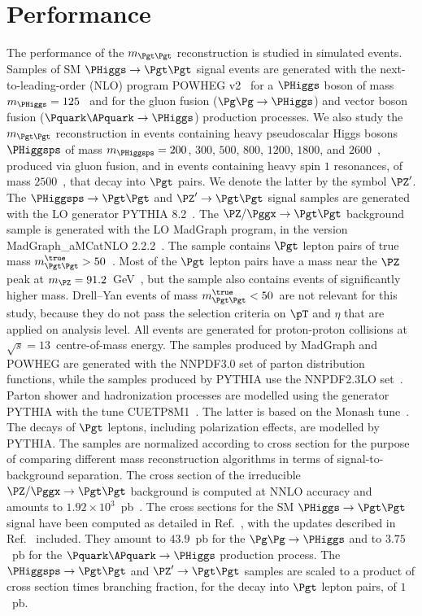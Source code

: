 \section{Performance}
\label{sec:performance}

The performance of the $m_{\Pgt\Pgt}$ reconstruction is studied in simulated events.
Samples of SM $\PHiggs \to \Pgt\Pgt$ signal events
are generated with the next-to-leading-order (NLO) program POWHEG v2~\cite{POWHEG1,POWHEG2,POWHEG3}
for a $\PHiggs$ boson of mass $m_{\PHiggs} = 125$~\GeV 
and for the gluon fusion ($\Pg\Pg \to \PHiggs$) and vector boson fusion ($\Pquark\APquark \to \PHiggs$) production processes.
We also study the $m_{\Pgt\Pgt}$ reconstruction in events containing
heavy pseudoscalar Higgs bosons $\PHiggsps$ of mass $m_{\PHiggsps} = 200$, $300$, $500$, $800$, $1200$, $1800$, and $2600$~\GeV,
produced via gluon fusion, and in events containing heavy spin $1$
resonances, of mass $2500$~\GeV, that decay into $\Pgt$ pairs.
We denote the latter by the symbol $\PZ'$. 
The $\PHiggsps \to \Pgt\Pgt$ and $\PZ' \to \Pgt\Pgt$ signal samples are generated with the LO generator PYTHIA 8.2~\cite{pythia8}.
The $\PZ/\Pggx \to \Pgt\Pgt$ background sample is generated with the LO MadGraph program, in the version MadGraph\_aMCatNLO 2.2.2~\cite{MadGraph_aMCatNLO}.
The sample contains $\Pgt$ lepton pairs of true mass $m_{\Pgt\Pgt}^{\true} > 50$~\GeV.
Most of the $\Pgt$ lepton pairs have a mass near the $\PZ$ peak at $m_{\PZ} = 91.2$~GeV~\cite{PDG}, 
but the sample also contains events of significantly higher mass.
Drell--Yan events of mass $m_{\Pgt\Pgt}^{\true} < 50$~\GeV are not relevant for this study, 
because they do not pass the selection criteria on $\pT$ and $\eta$ that are applied on analysis level.
All events are generated for proton-proton collisions at $\sqrt{s} = 13$~\TeV centre-of-mass energy.
The samples produced by MadGraph and POWHEG are generated with the NNPDF3.0 set of parton distribution functions,
while the samples produced by PYTHIA use the NNPDF2.3LO set~\cite{NNPDF1,NNPDF2,NNPDF3}.
Parton shower and hadronization processes are modelled using the generator PYTHIA with the tune CUETP8M1~\cite{PYTHIA_CUETP8M1tune_CMS}.
The latter is based on the Monash tune~\cite{PYTHIA_MonashTune}.
The decays of $\Pgt$ leptons, including polarization effects, are modelled by PYTHIA.
The samples are normalized according to cross section for the purpose of comparing different mass reconstruction algorithms in terms of signal-to-background separation.
The cross section of the irreducible $\PZ/\Pggx \to \Pgt\Pgt$ background is computed at NNLO accuracy and amounts to $1.92 \times 10^{3}$~pb~\cite{FEWZ}.
The cross sections for the SM $\PHiggs \to \Pgt\Pgt$ signal have been computed as detailed in Ref.~\cite{Dittmaier:2011ti},
with the updates described in Ref.~\cite{Heinemeyer:2013tqa} included.
They amount to $43.9$~pb for the $\Pg\Pg \to \PHiggs$ and to $3.75$~pb for the $\Pquark\APquark \to \PHiggs$ production process.
The $\PHiggsps \to \Pgt\Pgt$ and $\PZ' \to \Pgt\Pgt$ samples 
are scaled to a product of cross section times branching fraction, for the decay into $\Pgt$ lepton pairs, of $1$~pb.

